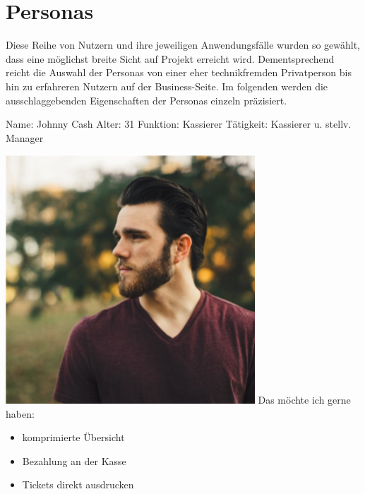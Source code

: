 \section{Personas}
Diese Reihe von Nutzern und ihre jeweiligen Anwendungsfälle wurden so gewählt, dass eine möglichst breite Sicht auf Projekt erreicht wird.
Dementsprechend reicht die Auswahl der Personas von einer eher technikfremden Privatperson bis hin zu erfahreren Nutzern auf der Business-Seite.
Im folgenden werden die ausschlaggebenden Eigenschaften der Personas einzeln präzisiert.

\begin{minipage}[t]{0.5\textwidth} 	\vspace{0.2\baselineskip} %
	\begin{entrylist}
		\entry
		{Name:}
		{Johnny Cash}
			\entry
		{Alter:}
		{31}
		\entry
		{Funktion:}
		{Kassierer}
		\entry
	{Tätigkeit:}
	{Kassierer u. stellv. Manager}
	\end{entrylist}
	\begin{barchart}{5.0}\hspace{-1mm}
	\end{barchart}
\end{minipage}
\hfil
\begin{minipage}[t]{0.4\textwidth} 	\vspace{0.0\baselineskip} %
	\flushright
	\includegraphics[width=0.70\textwidth]{img/johnny}
	\vspace{-0.2cm}
	\flushleft
	Das möchte ich gerne haben:
	\begin{itemize}
		\item komprimierte Übersicht
		\item Bezahlung an der Kasse
		\item Tickets direkt ausdrucken
	\end{itemize}
\end{minipage}

